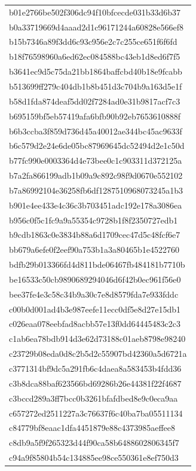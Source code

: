 \begin{tabular}{l}
b01e2766be502f306dc94f10bfcecde031b33d6b37 \\
b0a33719669d4aaad2d1c96171244a60828e566ef8 \\
b15b7346a89f3dd6c93c956e2c7c255ce651f6f6fd \\
b18f76598960a6ed62ec084588bc43eb1d8ed6f7f5 \\
b3641ec9d5c75da21bb1864baffcbd40b18e9fcabb \\
b513699ff279c404db1b8b451d3c704b9a163d5e1f \\
b58d1fda874deaf5dd02f7284ad0e31b9817acf7c3 \\
b695159bf5eb57419afa6bfb90b92eb7653610888f \\
b6b3ccba3f859d736d45a40012ae344bc45ac9633f \\
b6c579d2e24e6de05bc87969645dc52494d2e1c50d \\
b77fc990e0003364d4e73bee0c1c903311d372125a \\
b7a2fa866199adb1b09a9c892c98f9d0670e552102 \\
b7a86992104e36258fb6df1287510968073245a1b3 \\
b901e4ee433e4c36c3b703451adc192e178a3086ea \\
b956c0f5c1fc9a9a55354c9728b1f8f2350727edb1 \\
b9cdb1863c0e3834b88a6d1709cec47d5c48fcf6e7 \\
bb679a6efe0f2eef90a753b1a3a80465b1e4522760 \\
bdfb29b013366fd4d811bde06467fb484181b7710b \\
be16533c50cb9890689294046d6f42b0ec961f56e0 \\
bee37fe4e3c58c34b9a30c7e8d8579fda7e933fddc \\
c00b0d001ad4b3e987eefe11ecc0df5e8d27e15db1 \\
c026eaa078eebfad8acbb57e13f0dd64445483c2c3 \\
c1ab6ea78bdb914d3e62d73188c01aeb8798e98240 \\
c23729b08eda0d8c2b5d2c55907bd42360a5d6721a \\
c3771314bf9dc5a291fb6c4daea8a583453b4fdd36 \\
c3b8dca88baf623566bd69286b26e44381f22f4687 \\
c3bccd289a3ff7bcc0b3261bfafdbed8e9c0eca9aa \\
c657272ed2511227a3c76637f6c40ba7ba05511134 \\
c84779bf8eaac1dfa4451879e88c4373985aeffee8 \\
c8db9a5f9f265323d44f90ca58b6488602806345f7 \\
c94a9f85804b54c134885ee98ce550361e8ef750d3 \\

\end{tabular}
